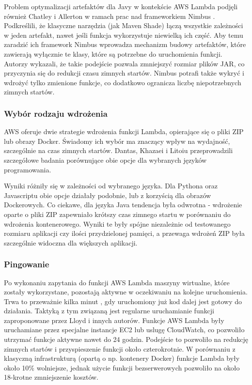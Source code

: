 Problem optymalizacji artefaktów dla Javy w kontekście AWS Lambda podjęli również Chatley i Allerton w ramach prac nad frameworkiem Nimbus \cite{10.1145/3377812.3382135}.
Podkreślili, że klasyczne narzędzia (jak Maven Shade) łączą wszystkie zależności w jeden artefakt, nawet jeśli funkcja wykorzystuje niewielką ich część.
Aby temu zaradzić ich framework Nimbus wprowadza mechanizm budowy artefaktów, które zawierają wyłącznie te klasy, które są potrzebne do uruchomienia funkcji.
Autorzy wykazali, że takie podejście pozwala zmniejszyć rozmiar plików JAR, co przyczynia się do redukcji czasu zimnych startów. 
Nimbus potrafi także wykryć i wdrożyć tylko zmienione funkcje, co dodatkowo ogranicza liczbę niepotrzebnych zimnych startów.

\subsubsection*{Wybór rodzaju wdrożenia}

AWS oferuje dwie strategie wdrożenia funkcji Lambda, opierające się o pliki ZIP lub obrazy Docker. 
Świadomy ich wybór ma znaczący wpływ na wydajność, szczególnie na czas zimnych startów.
Dantas, Khazaei i Litoiu \cite{9860368} przeprowadzili szczegółowe badania porównujące obie opcje dla wybranych języków programowania.

Wyniki różniły się w zależności od wybranego języka. Dla Pythona oraz Javascriptu obie opcje działały podobnie, lub z korzyścią dla obrazów Dockerowych. 
Co ciekawe, dla języka Java tendencja była odwrotna - wdrożenie oparte o pliki ZIP zapewniało krótszy czas zimnego startu w porównaniu do wdrożenia kontenerowego. 
Wyniki te były spójne niezależnie od testowanego rozmiaru aplikacji czy ilości przydzielonej pamięci, a przewaga wdrożeń ZIP była szczególnie widoczna dla większych aplikacji.

\subsubsection*{Pingowanie}

Po wykonaniu zapytania do funkcji AWS Lambda maszyny wirtualne, które zostały wykorzystane, pozostają aktywne w oczekiwaniu na kolejne uruchomienia. 
Trwa to przeważnie kilka minut \cite{9284261}, gdy uruchomiony już kod dalej jest gotowy do działania.
Taktyką z tym związaną jest regularne uruchamianie funkcji zaproponowane przez \cite{8605779} Lloyd i innych autorów. 
Funkcje AWS Lambda były uruchamiane przez specjalne instancje EC2 lub uslugę CloudWatch, co pozwoliło utrzymać funkcje aktywne nawet do 24 godzin.
Podejście to pozwoliło na redukcję zimnych startów i przyspieszenie funkcji około czterokrotnie.
W porównaniu z klasyczną infrastrukturą (opartą o np. kontenery Docker) funkcje Lambda były około 10\% wolniejsze, jednak użycie funkcji bezserwerowych pozwoliło na około 18-krotne zmniejszenie kosztów. 

